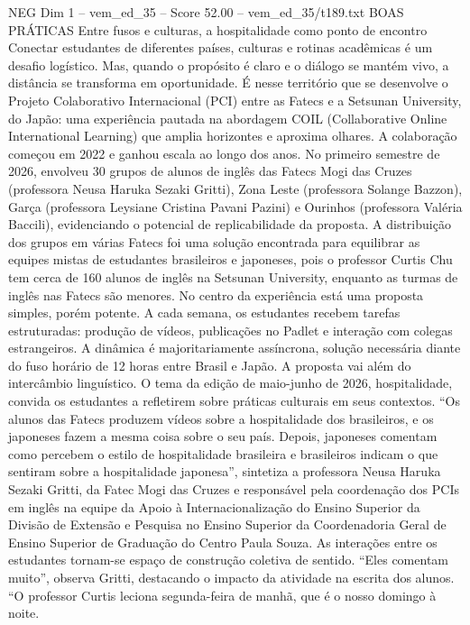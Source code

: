 \begin{textsample}{NEG Dim 1 – vem\_ed\_35 – Score 52.00 – vem\_ed\_35/t189.txt}  \label{ex:f1_neg_177}
BOAS PRÁTICAS Entre fusos e culturas, a hospitalidade como ponto de encontro Conectar estudantes de diferentes países, culturas e rotinas acadêmicas é um desafio logístico.
Mas, quando o propósito é claro e o diálogo se mantém vivo, a distância se transforma em oportunidade.
É nesse território que se desenvolve o Projeto Colaborativo Internacional (PCI) entre as Fatecs e a Setsunan University, do Japão: uma experiência pautada na abordagem COIL (Collaborative Online International Learning) que amplia horizontes e aproxima olhares.
A colaboração começou em 2022 e ganhou escala ao longo dos anos.
No primeiro semestre de 2026, envolveu 30 grupos de alunos de inglês das Fatecs Mogi das Cruzes (professora Neusa Haruka Sezaki Gritti), Zona Leste (professora Solange Bazzon), Garça (professora Leysiane Cristina Pavani Pazini) e Ourinhos (professora Valéria Baccili), evidenciando o potencial de replicabilidade da proposta.
A distribuição dos grupos em várias Fatecs foi uma solução encontrada para equilibrar as equipes mistas de estudantes brasileiros e japoneses, pois o professor Curtis Chu tem cerca de 160 alunos de inglês na Setsunan University, enquanto as turmas de inglês nas Fatecs são menores.
No centro da experiência está uma proposta simples, porém potente.
A cada semana, os estudantes recebem tarefas estruturadas: produção de vídeos, publicações no Padlet e interação com colegas estrangeiros.
A dinâmica é majoritariamente assíncrona, solução necessária diante do fuso horário de 12 horas entre Brasil e Japão.
A proposta vai além do intercâmbio linguístico.
O tema da edição de maio-junho de 2026, hospitalidade, convida os estudantes a refletirem sobre práticas culturais em seus contextos. “Os alunos das Fatecs produzem vídeos sobre a hospitalidade dos brasileiros, e os japoneses fazem a mesma coisa sobre o seu país.
Depois, japoneses comentam como percebem o estilo de hospitalidade brasileira e brasileiros indicam o que sentiram sobre a hospitalidade japonesa”, sintetiza a professora Neusa Haruka Sezaki Gritti, da Fatec Mogi das Cruzes e responsável pela coordenação dos PCIs em inglês na equipe da Apoio à Internacionalização do Ensino Superior da Divisão de Extensão e Pesquisa no Ensino Superior da Coordenadoria Geral de Ensino Superior de Graduação do Centro Paula Souza.
As interações entre os estudantes tornam-se espaço de construção coletiva de sentido. “Eles comentam muito”, observa Gritti, destacando o impacto da atividade na escrita dos alunos. “O professor Curtis leciona segunda-feira de manhã, que é o nosso domingo à noite.

\end{textsample}
